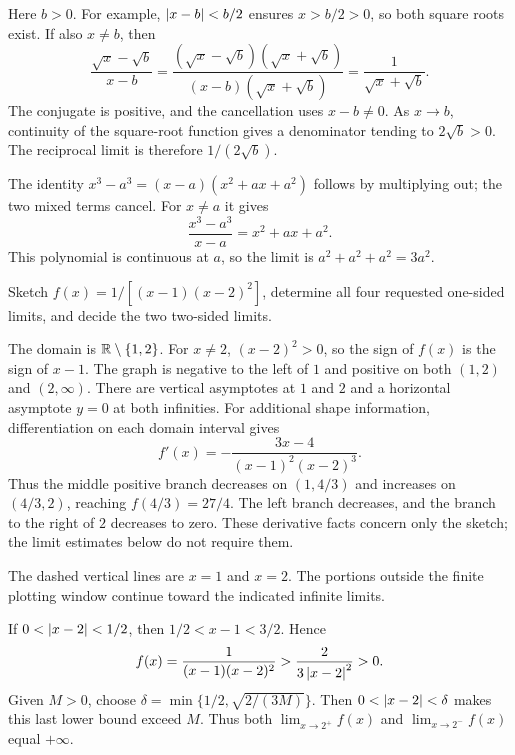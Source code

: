 Here $b>0$. For example, $\left|x-b\right|<b/2$ ensures $x>b/2>0$,
so both square roots exist. If also $x\ne b$, then
\[
 \frac{\sqrt x-\sqrt b}{x-b}
 =\frac{(\sqrt x-\sqrt b)(\sqrt x+\sqrt b)}
        {(x-b)(\sqrt x+\sqrt b)}
 =\frac1{\sqrt x+\sqrt b}.
\]
The conjugate is positive, and the cancellation uses $x-b\ne0$.
As $x\to b$, continuity of the square-root function gives a
denominator tending to $2\sqrt b>0$. The reciprocal limit is
therefore $1/(2\sqrt b)$.

The identity
$x^3-a^3=(x-a)(x^2+ax+a^2)$ follows by multiplying out; the
two mixed terms cancel. For $x\ne a$ it gives
\[
 \frac{x^3-a^3}{x-a}=x^2+ax+a^2.
\]
This polynomial is continuous at $a$, so the limit is
$a^2+a^2+a^2=3a^2$.

\goal Sketch $f(x)=1/[(x-1)(x-2)^2]$, determine all four
requested one-sided limits, and decide the two two-sided limits.

The domain is $\mathbb{R}\setminus\{1,2\}$.
For $x\ne2$, $(x-2)^2>0$, so the sign of $f(x)$ is the sign
of $x-1$. The graph is negative to the left of $1$ and positive
on both $(1,2)$ and $(2,\infty)$. There are vertical asymptotes
at $1$ and $2$ and a horizontal asymptote $y=0$ at both infinities.
For additional shape information, differentiation on each domain
interval gives
\[
 f'(x)=-\frac{3x-4}{(x-1)^2(x-2)^3}.
\]
Thus the middle positive branch decreases on $(1,4/3)$ and
increases on $(4/3,2)$, reaching $f(4/3)=27/4$.
The left branch decreases, and the branch to the right of $2$
decreases to zero. These derivative facts concern only the sketch;
the limit estimates below do not require them.
\begin{center}\rossSketchTwoPoles\end{center}
The dashed vertical lines are $x=1$ and $x=2$. The portions
outside the finite plotting window continue toward the indicated
infinite limits.

If $0<\left|x-2\right|<1/2$, then $1/2<x-1<3/2$. Hence
\[
 f(x)=\frac1{(x-1)(x-2)^2}
 >\frac{2}{3\left|x-2\right|^2}>0.
\]
Given $M>0$, choose
$\delta=\min\{1/2,\sqrt{2/(3M)}\}$.
Then $0<\left|x-2\right|<\delta$ makes this last lower bound exceed
$M$. Thus both $\lim_{x\to2^+}f(x)$ and
$\lim_{x\to2^-}f(x)$ equal $+\infty$.

